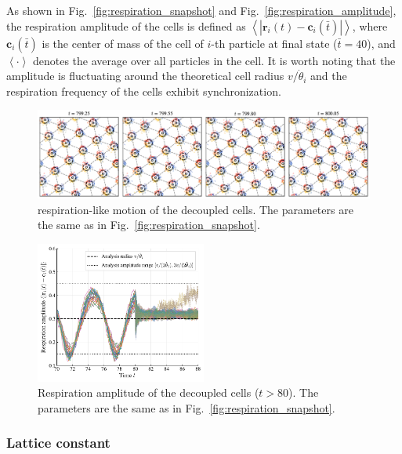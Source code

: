 \documentclass{article}
\begin{document}
As shown in Fig.~\ref{fig:respiration_snapshot} and Fig.~\ref{fig:respiration_amplitude}, the respiration amplitude of the cells is defined as $\left< \left| \mathbf{r}_i\left( t \right) -\mathbf{c}_i\left( \bar{t} \right) \right| \right> $, where $\mathbf{c}_i(\bar{t})$ is the center of mass of the cell of $i$-th particle at final state ($\bar{t}=40$), and $\left< \cdot \right>$ denotes the average over all particles in the cell. It is worth noting that the amplitude is fluctuating around the theoretical cell radius $v/\dot{\theta}_i$ and the
respiration frequency of the cells exhibit synchronization.

\begin{figure}[H]
    \centering
    \includegraphics[width=\textwidth]{./figs/respiration_snapshot_decoupled.pdf}
    \caption{
        respiration-like motion of the decoupled cells. The parameters are the same as in Fig.~\ref{fig:respiration_snapshot}.
    }
\end{figure}

\begin{figure}[H]
    \centering
    \includegraphics[width=0.5\textwidth]{./figs/respiration_amplitude_cells_decouled.pdf}
    \caption{
        Respiration amplitude of the decoupled cells ($t > 80$). The parameters are the same as in Fig.~\ref{fig:respiration_snapshot}.
    }
\end{figure}

\newpage
\subsubsection{Lattice constant}
\end{document}
